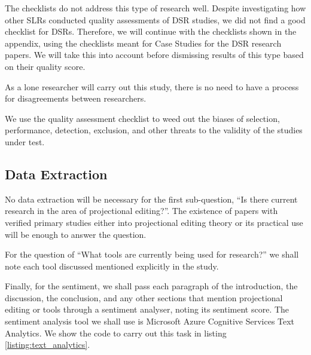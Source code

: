 The checklists do not address this type of research well.
Despite investigating how other SLRs conducted quality assessments of DSR studies, we did not find a good checklist for DSRs.
Therefore, we will continue with the checklists shown in the appendix, using the checklists meant for Case Studies for the DSR research papers.
We will take this into account before dismissing results of this type based on their quality score.

As a lone researcher will carry out this study, there is no need to have a process for disagreements between researchers.

We use the quality assessment checklist to weed out the biases of selection, performance, detection, exclusion, and other threats to the validity of the studies under test.


\subsection{Data Extraction}
\label{section:dataExtraction}
No data extraction will be necessary for the first sub-question,  ``Is there current research in the area of projectional editing?''.
The existence of papers with verified primary studies either into projectional editing theory or its practical use will be enough to answer the question.

For the question of ``What tools are currently being used for research?'' we shall note each tool discussed mentioned explicitly in the study.

Finally, for the sentiment, we shall pass each paragraph of the introduction, the discussion, the conclusion, and any other sections that mention projectional editing or tools through a sentiment analyser, noting its sentiment score.
The sentiment analysis tool we shall use is Microsoft Azure Cognitive Services Text Analytics.
We show the code to carry out this task in listing \ref{listing:text_analytics}.


